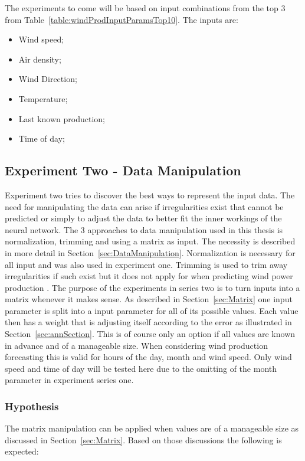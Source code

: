 The experiments to come will be based on input combinations from the top 3 from Table~\ref{table:windProdInputParamsTop10}. The inputs are:
\begin{itemize}
\item Wind speed;
\item Air density;
\item Wind Direction;
\item Temperature;
\item Last known production;
\item Time of day;
\end{itemize}


\subsection{Experiment Two - Data Manipulation}
\label{sec:windProdExperimentTwo}
Experiment two tries to discover the best ways to represent the input data. The need for manipulating the data can arise if irregularities exist that cannot be predicted or simply to adjust the data to better fit the inner workings of the neural network. The 3 approaches to data manipulation used in this thesis is normalization, trimming and using a matrix as input. The necessity is described in more detail in Section~\ref{sec:DataManipulation}. Normalization is necessary for all input and was also used in experiment one. Trimming is used to trim away irregularities if such exist but it does not apply for when predicting wind power production . The purpose of the experiments in series two is to turn inputs into a matrix whenever it makes sense. As described in Section~\ref{sec:Matrix} one input parameter is split into a input parameter for all of its possible values. Each value then has a weight that is adjusting itself according to the error as illustrated in Section~\ref{sec:annSection}. This is of course only an option if all values are known in advance and of a manageable size. When considering wind production forecasting this is valid for hours of the day, month and wind speed. Only wind speed and time of day will be tested here due to the omitting of the month parameter in experiment series one.

\subsubsection{Hypothesis} 
The matrix manipulation can be applied when values are of a manageable size as discussed in Section~\ref{sec:Matrix}. Based on those discussions the following is expected: 

